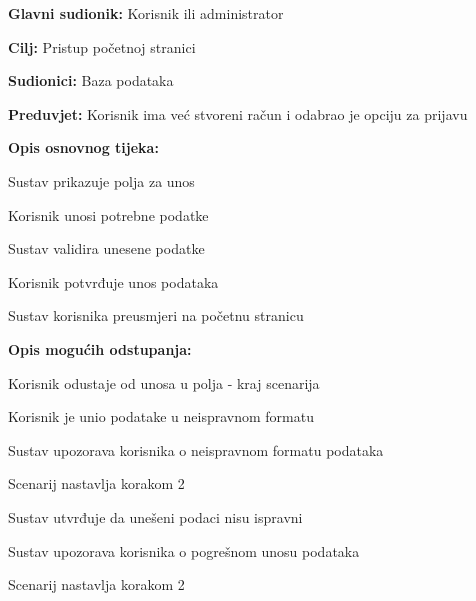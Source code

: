 					\noindent {}
					\begin{packed_item}
	
						\item \textbf{Glavni sudionik: }Korisnik ili administrator
						\item  \textbf{Cilj:} Pristup početnoj stranici
						\item  \textbf{Sudionici:} Baza podataka
						\item  \textbf{Preduvjet:} Korisnik ima već stvoreni račun i odabrao je opciju za prijavu
						\item  \textbf{Opis osnovnog tijeka:}
						
						\item[] \begin{packed_enum}
							\item Sustav prikazuje polja za unos
							\item Korisnik unosi potrebne podatke
							\item Sustav validira unesene podatke
							\item Korisnik potvrđuje unos podataka
							\item Sustav korisnika preusmjeri na početnu stranicu
						\end{packed_enum}
						\eject
						\item  \textbf{Opis mogućih odstupanja:}

						\item[] \begin{packed_item}
							\item[2.a] Korisnik odustaje od unosa u polja - kraj scenarija
							\item[3.a] Korisnik je unio podatake u neispravnom formatu
							\item[] \begin{packed_enum}
								\item Sustav upozorava korisnika o neispravnom formatu podataka
								\item Scenarij nastavlja korakom 2 
							\end{packed_enum}	
							\item[5.a] Sustav utvrđuje da unešeni podaci nisu ispravni
							\item[] \begin{packed_enum}
								\item Sustav upozorava korisnika o pogrešnom unosu podataka
								\item Scenarij nastavlja korakom 2 
							\end{packed_enum}					
						\end{packed_item}
					\end{packed_item}


